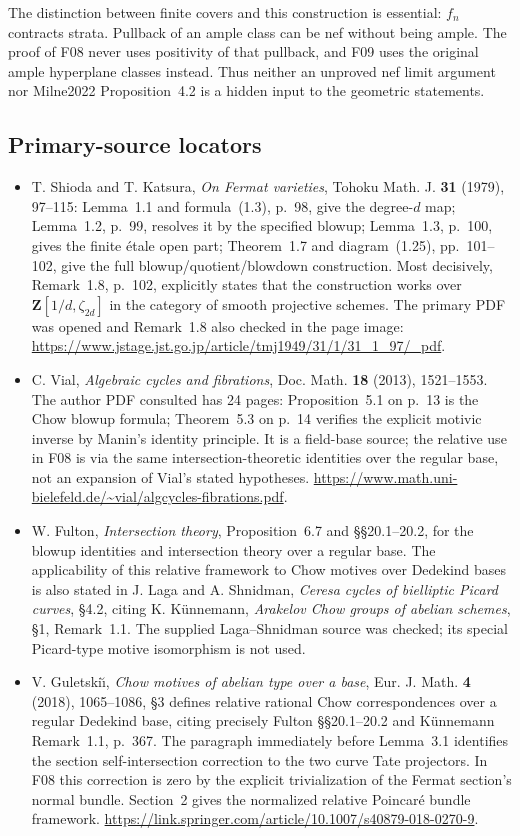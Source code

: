 \documentclass[11pt]{article}
\theoremstyle{remark}\newtheorem{remark}[theorem]{Remark}
\begin{document}
The distinction between finite covers and this construction is
essential: $f_n$ contracts strata. Pullback of an ample class
can be nef without being ample. The proof of F08 never uses
positivity of that pullback, and F09 uses the original ample
hyperplane classes instead. Thus neither an unproved nef limit
argument nor Milne2022 Proposition~4.2 is a hidden input to the
geometric statements.

\subsection{Primary-source locators}

\begin{itemize}
\item T. Shioda and T. Katsura, \emph{On Fermat varieties},
Tohoku Math. J. \textbf{31} (1979), 97--115:
Lemma~1.1 and formula~(1.3), p.~98, give the degree-$d$ map;
Lemma~1.2, p.~99, resolves it by the specified blowup;
Lemma~1.3, p.~100, gives the finite \'etale open part;
Theorem~1.7 and diagram~(1.25), pp.~101--102, give the full
blowup/quotient/blowdown construction. Most decisively,
Remark~1.8, p.~102, explicitly states that the construction
works over $\mathbf Z[1/d,\zeta_{2d}]$ in the category of
smooth projective schemes. The primary PDF was opened and
Remark~1.8 also checked in the page image:
\url{https://www.jstage.jst.go.jp/article/tmj1949/31/1/31_1_97/_pdf}.
\item C. Vial, \emph{Algebraic cycles and fibrations},
Doc. Math. \textbf{18} (2013), 1521--1553. The author PDF
consulted has 24 pages: Proposition~5.1 on p.~13 is the Chow
blowup formula; Theorem~5.3 on p.~14 verifies the explicit
motivic inverse by Manin's identity principle. It is a
field-base source; the relative use in F08 is via the same
intersection-theoretic identities over the regular base,
not an expansion of Vial's stated hypotheses.
\url{https://www.math.uni-bielefeld.de/~vial/algcycles-fibrations.pdf}.
\item W. Fulton, \emph{Intersection theory}, Proposition~6.7
and \S\S20.1--20.2, for the blowup identities and intersection
theory over a regular base. The applicability of this
relative framework to Chow motives over Dedekind bases is
also stated in J. Laga and A. Shnidman, \emph{Ceresa cycles of
bielliptic Picard curves}, \S4.2, citing K. K\"unnemann,
\emph{Arakelov Chow groups of abelian schemes}, \S1,
Remark~1.1. The supplied Laga--Shnidman source was checked;
its special Picard-type motive isomorphism is not used.
\item V. Guletski\u\i, \emph{Chow motives of abelian type over a
base}, Eur. J. Math. \textbf4 (2018), 1065--1086, \S3
defines relative rational Chow correspondences over a regular
Dedekind base, citing precisely Fulton \S\S20.1--20.2 and
K\"unnemann Remark~1.1, p.~367. The paragraph immediately
before Lemma~3.1 identifies the section self-intersection
correction to the two curve Tate projectors. In F08 this
correction is zero by the explicit trivialization of the
Fermat section's normal bundle. Section~2 gives the normalized
relative Poincar\'e bundle framework.
\url{https://link.springer.com/article/10.1007/s40879-018-0270-9}.
\end{itemize}
\end{document}
